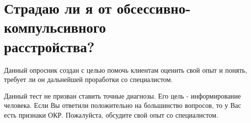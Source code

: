 \documentclass{../../shared/survey}
\begin{document}
\section*{\huge{Страдаю ли я от обсессивно-компульсивного \\ расстройства?}}

\begin{flushleft}
Данный опросник создан с целью помочь клиентам оценить свой опыт и понять, требует ли он дальнейшей проработки со специалистом.
\end{flushleft}







\begin{flushleft}
Данный тест не призван ставить точные диагнозы. Его цель - информирование человека. Если Вы ответили положительно на большинство вопросов, то у Вас есть признаки ОКР. Пожалуйста, обсудите свой опыт со специалистом.
\end{flushleft}
\end{document}

